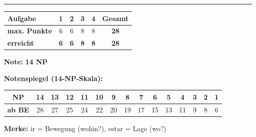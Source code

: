 \documentclass[11pt, a4paper]{article}
\newcommand{\lsg}[1]{\textcolor{loesung}{\textbf{#1}}}
\begin{document}

\vspace{25pt}
\hrule
\vspace{10pt}

\noindent
\begin{tabularx}{\textwidth}{|X|c|c|c|c||c|}
\hline
\textbf{Aufgabe} & 1 & 2 & 3 & 4 & \textbf{Gesamt} \\
\hline
\textbf{max. Punkte} & 6 & 6 & 8 & 8 & \textbf{28} \\
\hline
\textbf{erreicht} & \lsg{6} & \lsg{6} & \lsg{8} & \lsg{8} & \lsg{28} \\
\hline
\end{tabularx}

\vspace{10pt}

\begin{flushright}
\textbf{Note:} \lsg{14 NP}
\end{flushright}

\vspace{1em}

\textbf{Notenspiegel (14-NP-Skala):}

\begin{center}
\footnotesize
\begin{tabular}{|c|c|c|c|c|c|c|c|c|c|c|c|c|c|c|}
\hline
\textbf{NP} & 14 & 13 & 12 & 11 & 10 & 9 & 8 & 7 & 6 & 5 & 4 & 3 & 2 & 1 \\
\hline
\textbf{ab BE} & 28 & 27 & 25 & 24 & 22 & 20 & 19 & 17 & 15 & 13 & 11 & 9 & 8 & 6 \\
\hline
\end{tabular}
\end{center}

\vspace{1em}

\textcolor{loesung}{\textbf{Merke:} ir = Bewegung (wohin?), estar = Lage (wo?)}
\end{document}
